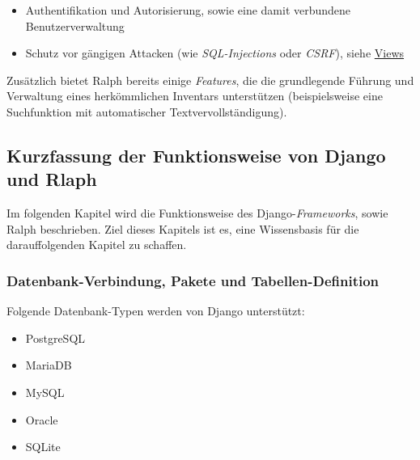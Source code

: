 \begin{itemize}
\tightlist
\item
  Authentifikation und Autorisierung, sowie eine damit verbundene
  Benutzerverwaltung
\item
  Schutz vor gängigen Attacken (wie
  \emph{SQL-Injections}
  oder
  \emph{CSRF}\cite{csrf}),
  siehe \protect\hyperlink{views}{Views}
\end{itemize}

Zusätzlich bietet Ralph bereits einige
\emph{Features},
die die grundlegende Führung und Verwaltung eines herkömmlichen
Inventars unterstützen (beispielsweise eine Suchfunktion mit
automatischer Textvervollständigung).

\hypertarget{kurzfassung-der-funktionsweise-von-django-und-rlaph}{%
\subsection{Kurzfassung der Funktionsweise von Django und
Rlaph}\label{kurzfassung-der-funktionsweise-von-django-und-rlaph}}

Im folgenden Kapitel wird die Funktionsweise des
Django-\emph{Frameworks},
sowie Ralph beschrieben. Ziel dieses Kapitels ist es, eine Wissensbasis
für die darauffolgenden Kapitel zu schaffen.

\hypertarget{datenbank-verbindung-pakete-und-tabellen-definition}{%
\subsubsection{Datenbank-Verbindung, Pakete und
Tabellen-Definition}\label{datenbank-verbindung-pakete-und-tabellen-definition}}

Folgende Datenbank-Typen werden von Django unterstützt:

\begin{itemize}
\tightlist
\item
  PostgreSQL
\item
  MariaDB
\item
  MySQL
\item
  Oracle
\item
  SQLite
\end{itemize}


